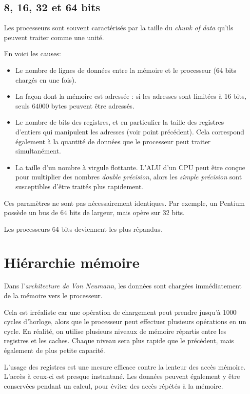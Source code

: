 	\subsection{8, 16, 32 et 64 bits}
	
Les processeurs sont souvent caractérisés par la taille du \textit{chunk of data} qu'ils peuvent traiter comme une unité.

En voici les causes:
\begin{itemize}
	\item Le nombre de lignes de données entre la mémoire et le processeur (64 bits chargés en une fois).
	\item La façon dont la mémoire est adressée : si les adresses sont limitées à 16 bits, seuls $64000$ bytes peuvent être
adressés. 
	\item Le nombre de bits des registres, et en particulier la taille des registres d'entiers qui manipulent les adresses (voir point précédent). Cela correspond également à la quantité de données que le processeur peut traiter simultanément.
	\item La taille d'un nombre à virgule flottante. L'ALU d'un CPU peut être conçue pour multiplier des nombres \textit{double précision}, alors les \textit{simple précision} sont susceptibles d'être traités plus rapidement.
\end{itemize}

Ces paramètres ne sont pas nécessairement identiques. Par exemple, un Pentium possède un bus de 64 bits de largeur, mais opère sur 32 bits.

Les processeurs 64 bits deviennent les plus répandus.

\section{Hiérarchie mémoire}

Dans l'\textit{architecture de Von Neumann}, les données sont chargées immédiatement de la mémoire vers le processeur.

Cela est irréaliste car une opération de chargement peut prendre jusqu'à 1000 cycles d'horloge, alors que le processeur peut effectuer plusieurs opérations en un cycle. En réalité, on utilise plusieurs niveaux de mémoire répartis entre les registres et les caches. Chaque niveau sera plus rapide que le précédent, mais également de plus petite capacité. 

L'usage des registres est une mesure efficace contre la lenteur des accès mémoire. L'accès à ceux-ci est presque instantané. Les données peuvent également y être conservées pendant un calcul, pour éviter des accès répétés à la mémoire.

